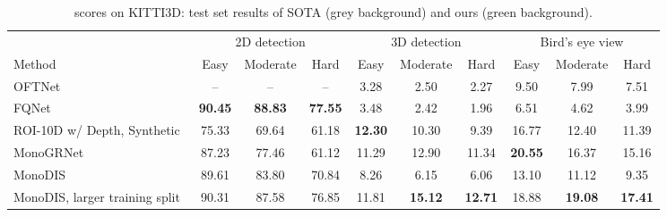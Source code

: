 \documentclass[10pt,twocolumn,letterpaper]{article}
\newcommand{\monodis}{MonoDIS}
\begin{document}
\begin{table*}
    \centering
    {\footnotesize
    \begin{tabular}{l|ccc|ccc|ccc}
        \toprule
        & \multicolumn{3}{c|}{2D detection} & \multicolumn{3}{c|}{3D detection} & \multicolumn{3}{c}{Bird's eye view} \\
        Method & Easy & Moderate & Hard & Easy & Moderate & Hard & Easy & Moderate & Hard \\
        \midrule
        \rowcolor[gray]{\gc}
        OFTNet~\cite{Roddick18} & -- & -- & -- & 3.28 & 2.50 & 2.27 & 9.50 & 7.99 & 7.51 \\
        \rowcolor[gray]{\gc}
        FQNet~\cite{Liu+19} & \textbf{90.45} & \textbf{88.83} & \textbf{77.55} & 3.48 & 2.42 & 1.96 & 6.51 & 4.62 & 3.99 \\
        \rowcolor[gray]{\gc}
        ROI-10D w/ Depth, Synthetic~\cite{Manhardt_2019_CVPR} & 75.33 & 69.64 & 61.18 & \textbf{12.30} & 10.30 & 9.39 & 16.77 & 12.40 & 11.39 \\
        \rowcolor[gray]{\gc}
        MonoGRNet~\cite{qin2019monogrnet} & 87.23 & 77.46 & 61.12 & 11.29 & 12.90 & 11.34 & \textbf{20.55} & 16.37 & 15.16 \\
        \rowcolor{mapillarygreen}
        \monodis{} & 89.61 & 83.80 & 70.84 & 8.26 & 6.15 & 6.06 & 13.10 & 11.12 & 9.35 \\
        \rowcolor{mapillarygreen}
        \monodis{}, larger training split
        & 90.31 &  87.58 & 76.85 & 11.81 & \textbf{15.12}& \textbf{12.71} & 18.88 & \textbf{19.08} & \textbf{17.41} \\
        \bottomrule
    \end{tabular}}
    \caption{ scores on KITTI3D: test set results of SOTA (grey background) and ours (green background).}
    \label{tab:ap11-test}
    \vspace{-10pt}
\end{table*}
\end{document}
